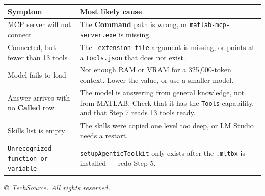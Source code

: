 \documentclass[11pt, letterpaper]{article}
\begin{document}
\begin{center}
\small
\begin{tabular}{@{}>{\raggedright\arraybackslash}p{} >{\raggedright\arraybackslash}p{}@{}}
\toprule
\textbf{Symptom} & \textbf{Most likely cause} \\
\midrule
MCP server will not connect
  & The \textbf{Command} path is wrong, or \texttt{matlab-mcp-server.exe} is missing. \\
Connected, but fewer than 13 tools
  & The \texttt{--extension-file} argument is missing, or points at a \texttt{tools.json} that does not exist. \\
Model fails to load
  & Not enough RAM or VRAM for a 325{,}000-token context. Lower the value, or use a smaller model. \\
Answer arrives with no \textbf{Called} row
  & The model is answering from general knowledge, not from MATLAB. Check that it has the
    \texttt{Tools} capability, and that Step 7 reads 13 tools ready. \\
Skills list is empty
  & The skills were copied one level too deep, or LM Studio needs a restart. \\
\texttt{Unrecognized function or variable}
  & \texttt{setupAgenticToolkit} only exists after the \texttt{.mltbx} is installed --- redo Step 5. \\
\bottomrule
\end{tabular}
\end{center}

\vfill
\begin{center}
  {\color{TSgray}\scriptsize\textit{\copyright{} \the\year{} TechSource. All rights reserved.}}
\end{center}
\end{document}

